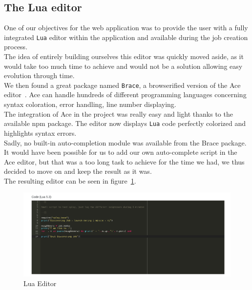 \documentclass{eplmastersthesis}
\begin{document}
        \subsection{The Lua editor}

          One of our objectives for the web application was to provide the user
          with a fully integrated \texttt{Lua} editor within the application and
          available during the job creation process.\\
          The idea of entirely building ourselves this editor was quickly
          moved aside, as it would take too much time to achieve and would not
          be a solution allowing easy evolution through time.\\
          We then found a great package named \texttt{Brace}, a browserified
          version of the Ace editor~\cite{Ace}. Ace can handle hundreds of
          different programming languages concerning syntax coloration,
          error handling, line number displaying.\\

          The integration of Ace in the project was really easy and light thanks
          to the available npm package. The editor now displays \texttt{Lua} code
          perfectly colorized and highlights syntax errors.\\

          Sadly, no built-in auto-completion module was available from the
          Brace package. It would have been possible for us to add our own
          auto-complete script in the Ace editor, but that was a too long
          task to achieve for the time we had, we thus decided to move on and
          keep the result as it was.\\

          The resulting editor can be seen in figure~\ref{luaeditor}.

          \begin{figure}
            \centering
            \includegraphics[scale=0.55]{figures/luaeditor.png}
            \caption{\label{luaeditor} Lua Editor}
          \end{figure}
\end{document}
